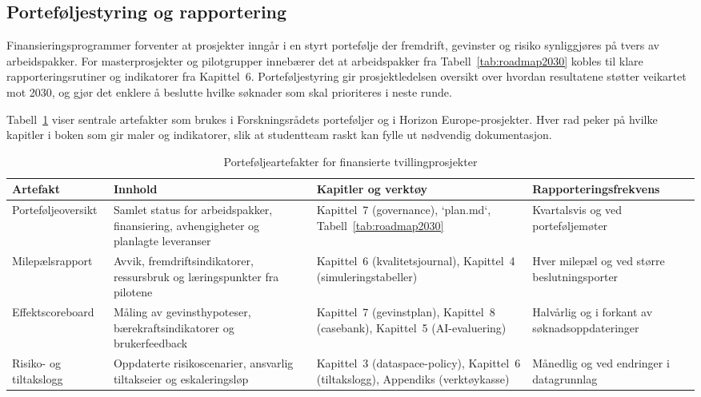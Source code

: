 \subsection{Porteføljestyring og rapportering}
Finansieringsprogrammer forventer at prosjekter inngår i en styrt portefølje der fremdrift, gevinster og risiko synliggjøres på tvers av arbeidspakker.\citep{rcn2024rapportering,eu2024heguide} For masterprosjekter og pilotgrupper innebærer det at arbeidspakker fra Tabell~\ref{tab:roadmap2030} kobles til klare rapporteringsrutiner og indikatorer fra Kapittel~6. Porteføljestyring gir prosjektledelsen oversikt over hvordan resultatene støtter veikartet mot 2030, og gjør det enklere å beslutte hvilke søknader som skal prioriteres i neste runde.

Tabell~\ref{tab:portefoljestyring} viser sentrale artefakter som brukes i Forskningsrådets porteføljer og i Horizon Europe-prosjekter. Hver rad peker på hvilke kapitler i boken som gir maler og indikatorer, slik at studentteam raskt kan fylle ut nødvendig dokumentasjon.

\begin{table}[h]
    \centering
    \caption{Porteføljeartefakter for finansierte tvillingprosjekter}
    \label{tab:portefoljestyring}
    \begin{tabular}{|p{3.4cm}|p{4.5cm}|p{4.2cm}|p{3.0cm}|}
        \hline
        \textbf{Artefakt} & \textbf{Innhold} & \textbf{Kapitler og verktøy} & \textbf{Rapporteringsfrekvens} \\\hline
        Porteføljeoversikt & Samlet status for arbeidspakker, finansiering, avhengigheter og planlagte leveranser & Kapittel~7 (governance), `plan.md`, Tabell~\ref{tab:roadmap2030} & Kvartalsvis og ved porteføljemøter \\\hline
        Milepælsrapport & Avvik, fremdriftsindikatorer, ressursbruk og læringspunkter fra pilotene & Kapittel~6 (kvalitetsjournal), Kapittel~4 (simuleringstabeller) & Hver milepæl og ved større beslutningsporter \\\hline
        Effektscoreboard & Måling av gevinsthypoteser, bærekraftsindikatorer og brukerfeedback & Kapittel~7 (gevinstplan), Kapittel~8 (casebank), Kapittel~5 (AI-evaluering) & Halvårlig og i forkant av søknadsoppdateringer \\\hline
        Risiko- og tiltakslogg & Oppdaterte risikoscenarier, ansvarlig tiltakseier og eskaleringsløp & Kapittel~3 (dataspace-policy), Kapittel~6 (tiltakslogg), Appendiks (verktøykasse) & Månedlig og ved endringer i datagrunnlag \\\hline
    \end{tabular}
\end{table}

